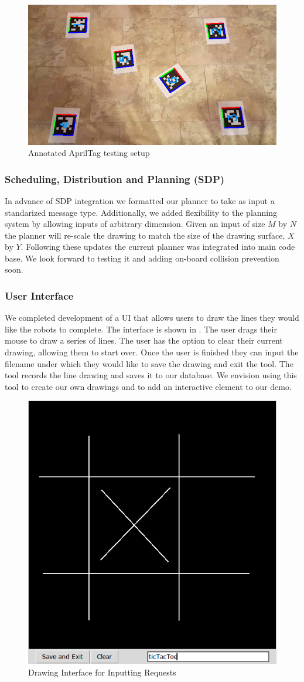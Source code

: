 \begin{figure}[h!]
\centering
\includegraphics[width=0.49\columnwidth]{figs/apriltag_test_annotated.png}
\caption{Annotated AprilTag testing setup}
\label{fig:localization_sample}
\end{figure}

\subsubsection{Scheduling, Distribution and Planning (SDP)}
In advance of SDP integration we formatted our planner to take as input a standarized message type. Additionally, we added flexibility to the planning system by allowing inputs of arbitrary dimension. Given an input of size $M$ by $N$ the planner will re-scale the drawing to match the size of the drawing surface, $X$ by $Y$. Following these updates the current planner was integrated into main code base. We look forward to testing it and adding on-board collision prevention soon.  

\subsubsection{User Interface}
We completed development of a UI that allows users to draw the lines they would like the robots to complete. The interface is shown in . The user drags their mouse to draw a series of lines. The user has the option to clear their current drawing, allowing them to start over. Once the user is finished they can input the filename under which they would like to save the drawing and exit the tool. The tool records the line drawing and saves it to our database. We envision using this tool to create our own drawings and to add an interactive element to our demo.   

\begin{figure}[h!]
\centering
\includegraphics[width=0.49\columnwidth]{figs/drawingInterface.png}
\caption{Drawing Interface for Inputting Requests}
\label{fig:drawing_interface}
\end{figure}

